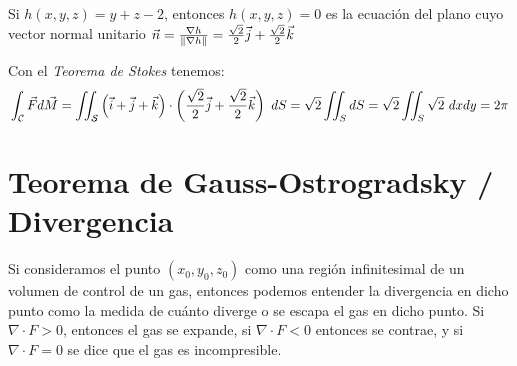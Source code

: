 \documentclass{report}
\begin{document}
{      \vspace{0.4cm}Si $h(x,y,z)=y+z-2$, entonces $h(x,y,z)=0$ es la ecuación del plano cuyo vector normal unitario $\vec{n}=\frac{\nabla h}{\lVert\nabla h\rVert}=\frac{\sqrt{2}}{2}\vec{j}+\frac{\sqrt{2}}{2}\vec{k}$
      
      \vspace{0.6cm}Con el \textit{Teorema de Stokes} tenemos:
      $$\int_{\mcC}\vec{F}d\vec{M}=\iint_{\mcS}\left(\vec{i}+\vec{j}+\vec{k}\right)\cdot\left(\frac{\sqrt{2}}{2}\vec{j}+\frac{\sqrt{2}}{2}\vec{k}\right)\ dS=
      \sqrt{2}\iint_S dS=\sqrt{2}\iint_S \sqrt{2}\ dxdy=2\pi$$
    }
  \clearpage
  \section{Teorema de Gauss-Ostrogradsky / Divergencia}
    \noindent Si consideramos el punto $(x_0,y_0,z_0)$ como una región infinitesimal de un volumen de control de un gas, entonces podemos entender la divergencia en dicho punto como la medida de cuánto diverge
    o se escapa el gas en dicho punto. Si $\nabla \cdot F>0$, entonces el gas se expande, si $\nabla\cdot F<0$ entonces se contrae, y si $\nabla \cdot F=0$ se dice que el gas es incompresible.\\
\end{document}
